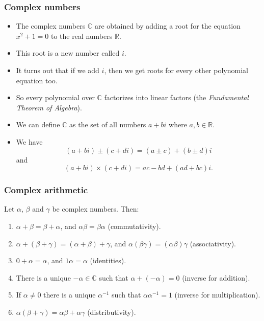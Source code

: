 \documentclass[handout]{beamer}
\newcommand{\bR}{\mathbb{R}}
\newcommand{\bC}{\mathbb{C}}
\begin{document}
\begin{frame}
\frametitle{Complex numbers}
\begin{itemize}
\item The complex numbers $\bC$ are obtained by adding a root for the equation $x^2+1 = 0$ to the real numbers $\bR$.
\item This root is a new number called $i$.
\item It turns out that if we add $i$, then we get roots for every other polynomial equation too.
\item So every polynomial over $\bC$ factorizes into linear factors (the \emph{Fundamental Theorem of Algebra}).
\item We can define $\bC$ as the set of all numbers $a+bi$ where $a,b\in \bR$.
\item We have 
\[(a+bi)\pm (c+di) = (a\pm c) +(b\pm d)i\]
and
\[(a+bi)\times(c+di) = ac - bd +(ad+bc)i.\]
\end{itemize}
\end{frame}

\begin{frame}
\frametitle{Complex arithmetic}
\begin{lemma}
Let $\alpha$, $\beta$ and $\gamma$ be complex numbers. Then:
\begin{enumerate}
\item $\alpha + \beta = \beta + \alpha$, and $\alpha\beta = \beta\alpha$ (commutativity).
\item $\alpha + (\beta + \gamma) = (\alpha + \beta) +\gamma$, and $\alpha(\beta\gamma) = (\alpha\beta)\gamma$ (associativity).
\item $0 + \alpha = \alpha$, and $1\alpha = \alpha$ (identities).
\item There is a unique $-\alpha\in\bC$ such that $\alpha + (-\alpha) = 0$ (inverse for addition).
\item If $\alpha\neq 0$ there is a unique $\alpha^{-1}$ such that $\alpha\alpha^{-1} = 1$ (inverse for multiplication).
\item $\alpha(\beta + \gamma) = \alpha\beta + \alpha\gamma$ (distributivity). 
\end{enumerate}
\end{lemma}
\end{frame}
\end{document}
